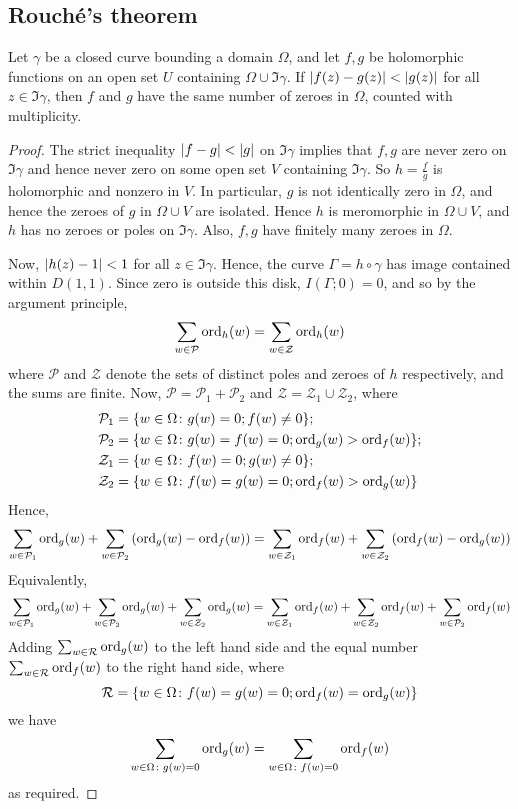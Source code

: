 \subsection{Rouch\'e's theorem}
\begin{theorem}
	Let \( \gamma \) be a closed curve bounding a domain \( \Omega \), and let \( f,g \) be holomorphic functions on an open set \( U \) containing \( \Omega \cup \Im \gamma \).
	If \( \abs{f(z) - g(z)} < \abs{g(z)} \) for all \( z \in \Im \gamma \), then \( f \) and \( g \) have the same number of zeroes in \( \Omega \), counted with multiplicity.
\end{theorem}
\begin{proof}
	The strict inequality \( \abs{f-g} < \abs{g} \) on \( \Im \gamma \) implies that \( f,g \) are never zero on \( \Im \gamma \) and hence never zero on some open set \( V \) containing \( \Im \gamma \).
	So \( h = \frac{f}{g} \) is holomorphic and nonzero in \( V \).
	In particular, \( g \) is not identically zero in \( \Omega \), and hence the zeroes of \( g \) in \( \Omega \cup V \) are isolated.
	Hence \( h \) is meromorphic in \( \Omega \cup V \), and \( h \) has no zeroes or poles on \( \Im \gamma \).
	Also, \( f, g \) have finitely many zeroes in \( \Omega \).

	Now, \( \abs{h(z) - 1} < 1 \) for all \( z \in \Im \gamma \).
	Hence, the curve \( \Gamma = h \circ \gamma \) has image contained within \( D(1,1) \).
	Since zero is outside this disk, \( I(\Gamma;0) = 0 \), and so by the argument principle,
	\[
		\sum_{w \in \mathcal P} \operatorname{ord}_h(w) = \sum_{w \in \mathcal Z} \operatorname{ord}_h(w)
	\]
	where \( \mathcal P \) and \( \mathcal Z \) denote the sets of distinct poles and zeroes of \( h \) respectively, and the sums are finite.
	Now, \( \mathcal P = \mathcal P_1 + \mathcal P_2 \) and \( \mathcal Z = \mathcal Z_1 \cup \mathcal Z_2 \), where
	\begin{align*}
		\mathcal P_1 & = \qty{w \in \Omega \colon g(w) = 0; f(w) \neq 0};                  \\
		\mathcal P_2 & = \qty{w \in \Omega \colon g(w) = f(w) = 0; \operatorname{ord}_g(w) > \operatorname{ord}_f(w)}; \\
		\mathcal Z_1 & = \qty{w \in \Omega \colon f(w) = 0; g(w) \neq 0};                  \\
		\mathcal Z_2 & = \qty{w \in \Omega \colon f(w) = g(w) = 0; \operatorname{ord}_f(w) > \operatorname{ord}_g(w)}
	\end{align*}
	Hence,
	\[
		\sum_{w \in \mathcal P_1} \operatorname{ord}_g(w) + \sum_{w \in \mathcal P_2} \qty(\operatorname{ord}_g(w) - \operatorname{ord}_f(w)) = \sum_{w \in \mathcal Z_1} \operatorname{ord}_f(w) + \sum_{w \in \mathcal Z_2} \qty(\operatorname{ord}_f(w) - \operatorname{ord}_g(w))
	\]
	Equivalently,
	\[
		\sum_{w \in \mathcal P_1} \operatorname{ord}_g(w) + \sum_{w \in \mathcal P_2} \operatorname{ord}_g(w) + \sum_{w \in \mathcal Z_2} \operatorname{ord}_g(w) =
		\sum_{w \in \mathcal Z_1} \operatorname{ord}_f(w) + \sum_{w \in \mathcal Z_2} \operatorname{ord}_f(w) + \sum_{w \in \mathcal P_2} \operatorname{ord}_f(w)
	\]
	Adding \( \sum_{w \in \mathcal R} \operatorname{ord}_g(w) \) to the left hand side and the equal number \( \sum_{w \in \mathcal R} \operatorname{ord}_f(w) \) to the right hand side, where
	\[
		\mathcal R = \qty{w \in \Omega \colon f(w) = g(w) = 0; \operatorname{ord}_f(w) = \operatorname{ord}_g(w)}
	\]
	we have
	\[
		\sum_{w \in \Omega \colon g(w) = 0} \operatorname{ord}_g(w) = \sum_{w \in \Omega \colon f(w) = 0} \operatorname{ord}_f(w)
	\]
	as required.
\end{proof}
